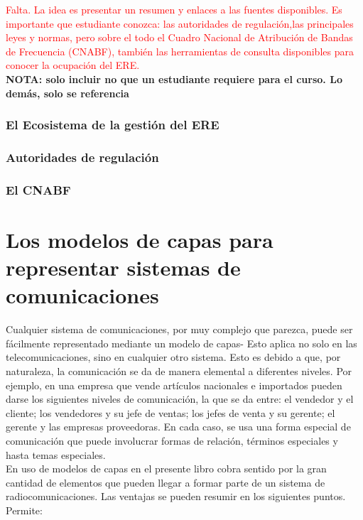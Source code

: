 \textcolor{red}{Falta. La idea es presentar un resumen y enlaces a las fuentes disponibles. Es importante que estudiante conozca: las autoridades de regulación,las principales leyes y normas, pero sobre el todo el Cuadro Nacional de Atribución de Bandas de Frecuencia (CNABF), también las herramientas de consulta disponibles para conocer la ocupación del ERE.} \\

\textbf{NOTA: solo incluir no que un estudiante requiere para el curso. Lo demás, solo se referencia} \\

\subsubsection{El Ecosistema de la gestión del ERE}
\subsubsection{Autoridades de regulación}
\subsubsection{El CNABF}


\section{Los modelos de capas para representar sistemas de comunicaciones}

Cualquier sistema de comunicaciones, por muy complejo que parezca, puede ser fácilmente representado mediante un modelo de capas- Esto aplica no solo en las telecomunicaciones, sino en cualquier otro sistema. Esto es debido a que, por naturaleza, la comunicación se da de manera elemental a diferentes niveles. Por ejemplo, en una empresa que vende artículos nacionales e importados pueden darse los siguientes niveles de comunicación, la que se da entre: el vendedor y el cliente; los vendedores y su jefe de ventas; los jefes de venta y su gerente; el gerente y las empresas proveedoras. En cada caso, se usa una forma especial de comunicación que puede involucrar formas de relación, términos especiales y hasta temas especiales.\\

En uso de modelos de capas en el presente libro cobra sentido por la gran cantidad de elementos que pueden llegar a formar parte de un sistema de radiocomunicaciones. Las ventajas se pueden resumir en los siguientes puntos. Permite:\\

